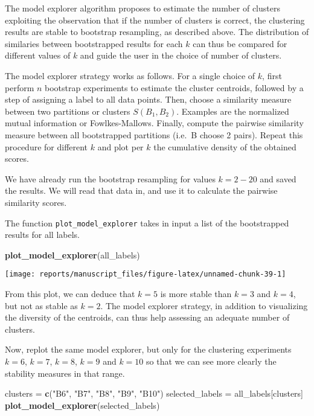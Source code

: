 \documentclass[9pt,a4paper,]{extarticle}
\newenvironment{Shaded}{\begin{snugshade}}{\end{snugshade}}
\newcommand{\KeywordTok}[1]{\textcolor[rgb]{0.13,0.29,0.53}{\textbf{#1}}}
\newcommand{\NormalTok}[1]{#1}
\newcommand{\StringTok}[1]{\textcolor[rgb]{0.31,0.60,0.02}{#1}}
\begin{document}
The model explorer algorithm \citep{ben-hur:stability} proposes to estimate the
number of clusters exploiting the observation that if the number of clusters
is correct, the clustering results are stable to bootstrap resampling, as
described above. The distribution of similaries between bootstrapped results
for each \(k\) can thus be compared for different values of \(k\) and guide the
user in the choice of number of clusters.

The model explorer strategy works as follows. For a single choice of \(k\),
first perform \(n\) bootstrap experiments to estimate the cluster centroids,
followed by a step of assigning a label to all data points. Then, choose a
similarity measure between two partitions or clusters \(S(B_1, B_2)\). Examples
are the normalized mutual information or Fowlkes-Mallows. Finally, compute the
pairwise similarity measure between all bootstrapped partitions (i.e.~B choose
2 pairs). Repeat this procedure for different \(k\) and plot per \(k\) the
cumulative density of the obtained scores.

We have already run the bootstrap resampling for values \(k=2-20\) and saved the
results. We will read that data in, and use it to calculate the pairwise
similarity scores.

The function \texttt{plot\_model\_explorer} takes in input a list of the bootstrapped
results for all labels.

\begin{Shaded}
\begin{Highlighting}[]
\KeywordTok{plot_model_explorer}\NormalTok{(all_labels)}
\end{Highlighting}
\end{Shaded}

\begin{center}\texttt{[image: reports/manuscript\_files/figure-latex/unnamed-chunk-39-1]} \end{center}

From this plot, we can deduce that \(k=5\) is more stable than \(k=3\) and \(k=4\),
but not as stable as \(k=2\). The model explorer strategy, in addition to
visualizing the diversity of the centroids, can thus help assessing an
adequate number of clusters.

Now, replot the same model explorer, but only for the clustering experiments
\(k=6\), \(k=7\), \(k=8\), \(k=9\) and \(k=10\) so that we can see more clearly the stability
measures in that range.

\begin{Shaded}
\begin{Highlighting}[]
\NormalTok{clusters =}\StringTok{ }\KeywordTok{c}\NormalTok{(}\StringTok{"B6"}\NormalTok{, }\StringTok{"B7"}\NormalTok{, }\StringTok{"B8"}\NormalTok{, }\StringTok{"B9"}\NormalTok{, }\StringTok{"B10"}\NormalTok{)}
\NormalTok{selected_labels =}\StringTok{ }\NormalTok{all_labels[clusters]}
\KeywordTok{plot_model_explorer}\NormalTok{(selected_labels)}
\end{Highlighting}
\end{Shaded}
\end{document}
